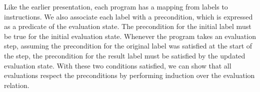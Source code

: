 Like the earlier presentation, each program has a mapping from labels to instructions.
We also associate each label with a precondition, which is expressed as a predicate of the evaluation state.
The precondition for the initial label must be true for the initial evaluation state.
Whenever the program takes an evaluation step, assuming the precondition for the original label was satisfied at the start of the step, the precondition for the result label must be satisfied by the updated evaluation state.
With these two conditions satisfied, we can show that all evaluations respect the preconditions by performing induction over the evaluation relation.

% 
